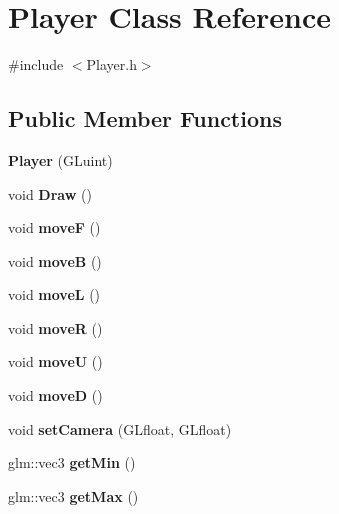 \hypertarget{classPlayer}{}\section{Player Class Reference}
\label{classPlayer}


{\ttfamily \#include $<$Player.\+h$>$}

\subsection*{Public Member Functions}
\begin{DoxyCompactItemize}
\item 
{\bfseries Player} (G\+Luint)\hypertarget{classPlayer_a0f090add8ef5ced1841e7e3517e09c09}{}\label{classPlayer_a0f090add8ef5ced1841e7e3517e09c09}

\item 
void {\bfseries Draw} ()\hypertarget{classPlayer_a00ae3ebe88af8f9cfabd819176516a73}{}\label{classPlayer_a00ae3ebe88af8f9cfabd819176516a73}

\item 
void {\bfseries moveF} ()\hypertarget{classPlayer_a62dfb3a0d78231f2247aedbe28f2e4a6}{}\label{classPlayer_a62dfb3a0d78231f2247aedbe28f2e4a6}

\item 
void {\bfseries moveB} ()\hypertarget{classPlayer_a7f941c85236bbf5007f7cc4d584d8837}{}\label{classPlayer_a7f941c85236bbf5007f7cc4d584d8837}

\item 
void {\bfseries moveL} ()\hypertarget{classPlayer_a3cb72f5babfc5e06a02a06a99cda0d5e}{}\label{classPlayer_a3cb72f5babfc5e06a02a06a99cda0d5e}

\item 
void {\bfseries moveR} ()\hypertarget{classPlayer_aecdd233e935159c57e9adf69ac3c1e14}{}\label{classPlayer_aecdd233e935159c57e9adf69ac3c1e14}

\item 
void {\bfseries moveU} ()\hypertarget{classPlayer_a813cc9bf7d1fee3db6fa863ebbcac502}{}\label{classPlayer_a813cc9bf7d1fee3db6fa863ebbcac502}

\item 
void {\bfseries moveD} ()\hypertarget{classPlayer_a7c99fd3922f9f3af779d8611be236853}{}\label{classPlayer_a7c99fd3922f9f3af779d8611be236853}

\item 
void {\bfseries set\+Camera} (G\+Lfloat, G\+Lfloat)\hypertarget{classPlayer_a41bae651f90eb67a84f801e89c6e6072}{}\label{classPlayer_a41bae651f90eb67a84f801e89c6e6072}

\item 
glm\+::vec3 {\bfseries get\+Min} ()\hypertarget{classPlayer_aed6199ac6d37ec3795750b4058a7230b}{}\label{classPlayer_aed6199ac6d37ec3795750b4058a7230b}

\item 
glm\+::vec3 {\bfseries get\+Max} ()\hypertarget{classPlayer_ae3e6a1b495d4c086a3ea7e2f10421971}{}\label{classPlayer_ae3e6a1b495d4c086a3ea7e2f10421971}

\end{DoxyCompactItemize}


